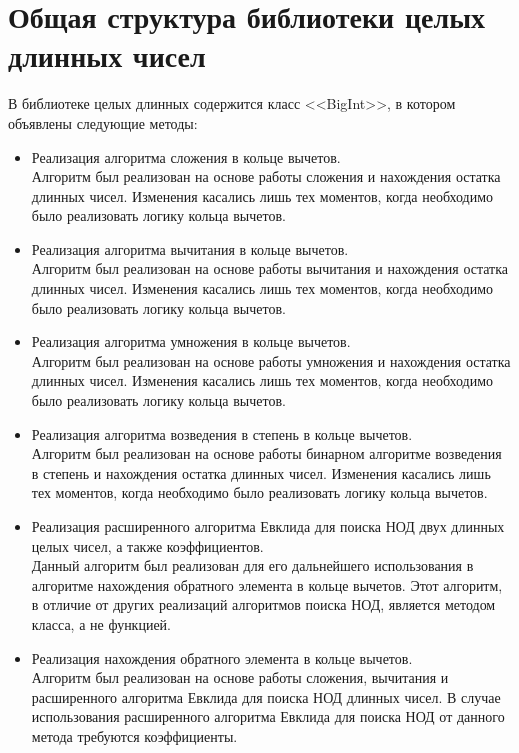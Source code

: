 \section{Общая структура библиотеки целых\\длинных чисел}
В библиотеке целых длинных содержится класс <<BigInt>>, в котором объявлены следующие методы:
\begin{itemize}
    \item Реализация алгоритма сложения в кольце вычетов.\\
    Алгоритм был реализован на основе работы сложения и нахождения остатка длинных чисел.
    Изменения касались лишь тех моментов, когда необходимо было реализовать логику кольца вычетов.
    \item Реализация алгоритма вычитания в кольце вычетов.\\
    Алгоритм был реализован на основе работы вычитания и нахождения остатка длинных чисел.
    Изменения касались лишь тех моментов, когда необходимо было реализовать логику кольца вычетов.
    \item Реализация алгоритма умножения в кольце вычетов.\\
    Алгоритм был реализован на основе работы умножения и нахождения остатка длинных чисел.
    Изменения касались лишь тех моментов, когда необходимо было реализовать логику кольца вычетов.
    \item Реализация алгоритма возведения в степень в кольце вычетов.\\
    Алгоритм был реализован на основе работы бинарном алгоритме возведения в степень и нахождения остатка длинных чисел.
    Изменения касались лишь тех моментов, когда необходимо было реализовать логику кольца вычетов.
    \item Реализация расширенного алгоритма Евклида для поиска НОД двух длинных целых чисел, а также коэффициентов.\\
    Данный алгоритм был реализован для его дальнейшего использования в алгоритме нахождения обратного элемента в кольце вычетов.
    Этот алгоритм, в отличие от других реализаций алгоритмов поиска НОД, является методом класса, а не функцией.
    \item Реализация нахождения обратного элемента в кольце вычетов.\\
    Алгоритм был реализован на основе работы сложения, вычитания и расширенного алгоритма Евклида для поиска НОД длинных чисел.
    В случае использования расширенного алгоритма Евклида для поиска НОД от данного метода требуются коэффициенты.
\end{itemize}

